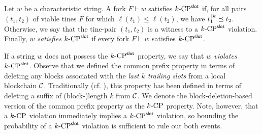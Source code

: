 \begin{definition}\label{def:cp-slot}
  Let $w$ be a characteristic string. A fork $F \vdash w$ satisfies
  ${k}\text{-}\mathrm{CP}^{\mathsf{slot}}$ if, for all pairs $(t_1, t_2)$ of viable tines $F$ for
  which $\ell(t_1) \leq \ell(t_2)$, we have $t_1^{\lceil {k}} \preceq t_2$. 
  Otherwise, we say that the tine-pair $(t_1, t_2)$ is a witness to a ${k}\text{-}\mathrm{CP}^{\mathsf{slot}}$ violation.
  Finally, \emph{$w$ satisfies ${k}\text{-}\mathrm{CP}^{\mathsf{slot}}$} if every fork $F \vdash w$ satisfies ${k}\text{-}\mathrm{CP}^{\mathsf{slot}}$.
\end{definition} 
If a string $w$ does not possess the ${k}\text{-}\mathrm{CP}^{\mathsf{slot}}$ property, 
we say that \emph{$w$ violates ${k}\text{-}\mathrm{CP}^{\mathsf{slot}}$}.
Observe that we defined the common prefix property in terms of
deleting any blocks associated with the \emph{last $k$ trailing slots}
from a local blockchain $\mathcal{C}$.  Traditionally
(cf. \cite{C:GarKiaLeo17}), this property has been defined in terms of
deleting a suffix of (block-)length $k$ from $\mathcal{C}$.  We denote the
block-deletion-based version of the common prefix property as the
${k}\text{-}\mathrm{CP}$ property.  Note, however, that a ${k}\text{-}\mathrm{CP}$ violation immediately
implies a ${k}\text{-}\mathrm{CP}^{\mathsf{slot}}$ violation, so bounding the probability of a
${k}\text{-}\mathrm{CP}^{\mathsf{slot}}$ violation is sufficient to rule out both events.



